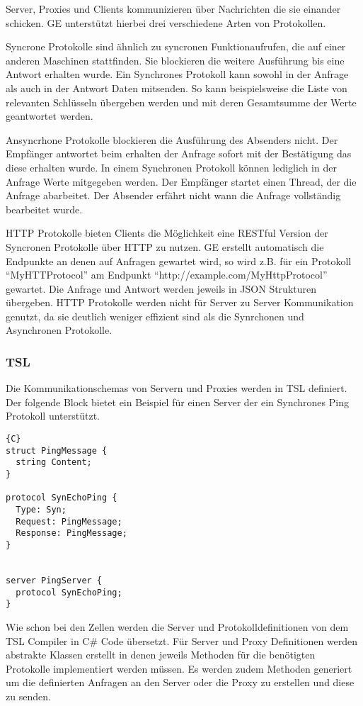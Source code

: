 Server, Proxies und Clients kommunizieren über Nachrichten die sie einander schicken. GE unterstützt hierbei drei verschiedene Arten von Protokollen.


Syncrone Protokolle sind ähnlich zu syncronen Funktionaufrufen, die auf einer anderen Maschinen stattfinden. Sie blockieren die weitere Ausführung bis
eine Antwort erhalten wurde. Ein Synchrones Protokoll kann sowohl in der Anfrage als auch in der Antwort Daten mitsenden. So kann beispielsweise die Liste von
relevanten Schlüsseln übergeben werden und mit deren Gesamtsumme der Werte geantwortet werden.


Ansyncrhone Protokolle blockieren die Ausführung des Absenders nicht. Der Empfänger antwortet beim erhalten der Anfrage sofort mit der Bestätigung das diese erhalten wurde.
In einem Synchronen Protokoll können lediglich in der Anfrage Werte mitgegeben werden.
Der Empfänger startet einen Thread, der die Anfrage abarbeitet. Der Absender erfährt nicht wann die Anfrage vollständig bearbeitet wurde.


HTTP Protokolle bieten Clients die Möglichkeit eine RESTful Version der Syncronen Protokolle über HTTP zu nutzen. GE erstellt automatisch die Endpunkte an denen
auf Anfragen gewartet wird, so wird z.B. für ein Protokoll ``MyHTTProtocol'' am Endpunkt ``http://example.com/MyHttpProtocol'' gewartet. Die Anfrage und
Antwort werden jeweils in JSON Strukturen übergeben. HTTP Protokolle werden nicht für Server zu Server Kommunikation genutzt, da sie deutlich weniger effizient sind als die
Synrchonen und Asynchronen Protokolle.

\subsubsection{TSL}

Die Kommunikationschemas von Servern und Proxies werden in TSL definiert. Der folgende Block bietet ein Beispiel für einen Server der ein Synchrones Ping Protokoll unterstützt.

\begin{lstlisting}{C}
struct PingMessage {
  string Content;
}

protocol SynEchoPing {
  Type: Syn;
  Request: PingMessage;
  Response: PingMessage;
}


server PingServer {
  protocol SynEchoPing;
}
\end{lstlisting}

Wie schon bei den Zellen werden die Server und Protokolldefinitionen von dem TSL Compiler in C\# Code übersetzt. Für Server und Proxy
Definitionen werden abstrakte Klassen erstellt in denen jeweils Methoden für die benötigten Protokolle implementiert werden müssen.
Es werden zudem Methoden generiert um die definierten Anfragen an den Server oder die Proxy zu erstellen und diese zu senden.


